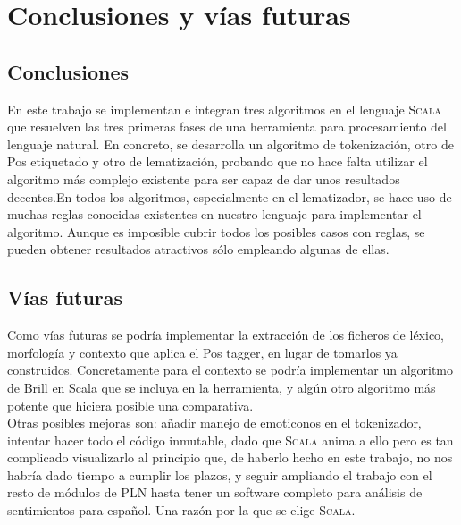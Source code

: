 \chapter{Conclusiones y vías futuras}
\label{conclusion}
\section{Conclusiones}
En este trabajo se implementan e integran tres algoritmos en el lenguaje \textsc{Scala} que resuelven las tres primeras fases de una herramienta para procesamiento del lenguaje natural. En concreto, se desarrolla un algoritmo de tokenización, otro de Pos etiquetado y otro de lematización, probando que no hace falta utilizar el algoritmo más complejo existente para ser capaz de dar unos resultados decentes.\newline En todos los algoritmos, especialmente en el lematizador, se hace uso de muchas reglas conocidas existentes en nuestro lenguaje para implementar el algoritmo. Aunque es imposible cubrir todos los posibles casos con reglas, se pueden obtener resultados atractivos sólo empleando algunas de ellas. 
\section{Vías futuras}
Como vías futuras se podría implementar la extracción de los ficheros de léxico, morfología y contexto que aplica el Pos tagger, en lugar de tomarlos ya construidos. Concretamente para el contexto se podría implementar un algoritmo de Brill en Scala que se incluya en la herramienta, y algún otro algoritmo más potente que hiciera posible una comparativa. 
\\[\baselineskip]
Otras posibles mejoras son: \newline
añadir manejo de emoticonos en el tokenizador, intentar hacer todo el código inmutable, dado que \textsc{Scala} anima a ello pero es tan complicado visualizarlo al principio que, de haberlo hecho en este trabajo, no nos habría dado tiempo a cumplir los plazos, y seguir ampliando el trabajo con el resto de módulos de PLN hasta tener un software completo para análisis de sentimientos para español. Una razón por la que se elige \textsc{Scala}. 